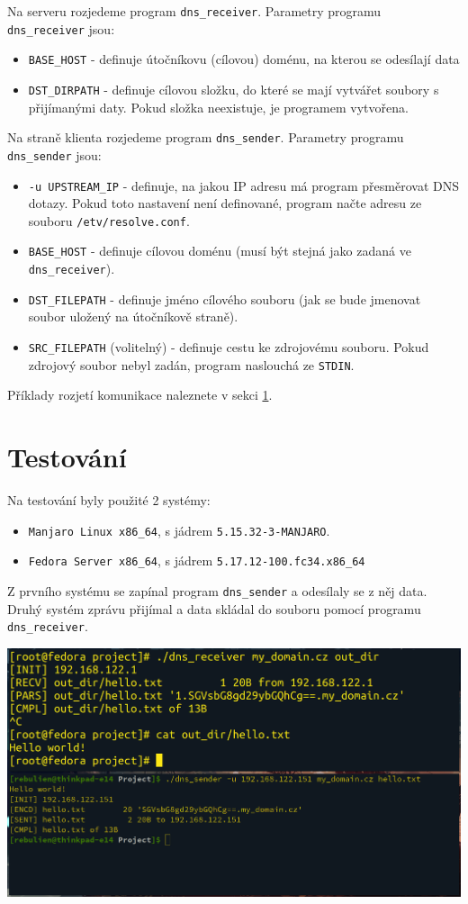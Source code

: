 \documentclass[a4paper,11pt]{article}
\begin{document}
    \noindent
    Na serveru rozjedeme program \verb|dns_receiver|. Parametry programu \verb|dns_receiver| jsou:
    \begin{itemize}
        \item \verb|BASE_HOST| \-- definuje útočníkovu (cílovou) doménu, na kterou se odesílají data
        \item \verb|DST_DIRPATH| \-- definuje cílovou složku, do které se mají vytvářet soubory s přijímanými daty.
        Pokud složka neexistuje, je programem vytvořena.
    \end{itemize}

    \noindent
    \label{sec:SenderUsage}
    Na straně klienta rozjedeme program \verb|dns_sender|. Parametry programu \verb|dns_sender| jsou:
    \begin{itemize}
        \item \verb|-u UPSTREAM_IP| \-- definuje, na jakou IP adresu má program přesměrovat DNS dotazy.
        Pokud toto nastavení není definované, program načte adresu ze souboru \verb|/etv/resolve.conf|.
        \item \verb|BASE_HOST| \-- definuje cílovou doménu (musí být stejná jako zadaná ve \verb|dns_receiver|).
        \item \verb|DST_FILEPATH| \-- definuje jméno cílového souboru (jak se bude jmenovat soubor uložený na útočníkově straně).
        \item \verb|SRC_FILEPATH| (volitelný) \-- definuje cestu ke zdrojovému souboru. Pokud zdrojový soubor nebyl zadán,
        program naslouchá ze \verb|STDIN|.
    \end{itemize}

    Příklady rozjetí komunikace naleznete v sekci \ref{sec:testovani}.

    \section{Testování}
    \label{sec:testovani}
    Na testování byly použité 2 systémy:
    \begin{itemize}
        \item \verb|Manjaro Linux x86_64|, s jádrem \verb|5.15.32-3-MANJARO|.
        \item \verb|Fedora Server x86_64|, s jádrem \verb|5.17.12-100.fc34.x86_64|
    \end{itemize}

    Z prvního systému se zapínal program \verb|dns_sender| a odesílaly se z něj data.
    Druhý systém zprávu přijímal a data skládal do souboru pomocí programu \verb|dns_receiver|.

    \noindent
    \includegraphics[width=\textwidth]{simple_text}

    
    \renewcommand{\refname}{Literatura}
    
    \nocite{ComputerNetworking}
    \nocite{SocketProgramming}
\end{document}
